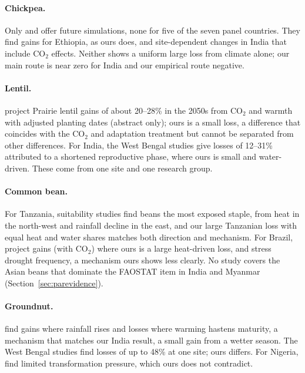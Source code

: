 \paragraph{Chickpea.} Only \citet{singh2014chickpea} and \citet{abera2026} offer future simulations, none for five of
the seven panel countries. They find gains for Ethiopia, as ours does, and site-dependent changes in India that
include CO$_2$ effects. Neither shows a uniform large loss from climate alone; our main route is near zero for India
and our empirical route negative.

\paragraph{Lentil.} \citet{qian2026} project Prairie lentil gains of about 20--28\% in the 2050s from CO$_2$ and
warmth with adjusted planting dates (abstract only); ours is a small loss, a difference that coincides with the
CO$_2$ and adaptation treatment but cannot be separated from other differences. For India, the West Bengal studies
\citep{chandran2022,chandran2023} give losses of 12--31\% attributed to a shortened reproductive phase, where ours is
small and water-driven. These come from one site and one research group.

\paragraph{Common bean.} For Tanzania, suitability studies \citep{rippke2016,hummel2018} find beans the most exposed
staple, from heat in the north-west and rainfall decline in the east, and our large Tanzanian loss with equal heat and
water shares matches both direction and mechanism. For Brazil, \citet{antolin2021} project gains (with CO$_2$) where ours
is a large heat-driven loss, and \citet{heinemann2017} stress drought frequency, a mechanism ours shows less clearly.
No study covers the Asian beans that dominate the FAOSTAT item in India and Myanmar (Section~\ref{sec:parevidence}).

\paragraph{Groundnut.} \citet{kadiyala2021} find gains where rainfall rises and losses where warming hastens maturity,
a mechanism that matches our India result, a small gain from a wetter season. The West Bengal studies
\citep{chandran2022,chandran2023} find losses of up to 48\% at one site; ours differs. For Nigeria,
\citet{rippke2016} find limited transformation pressure, which ours does not contradict.

